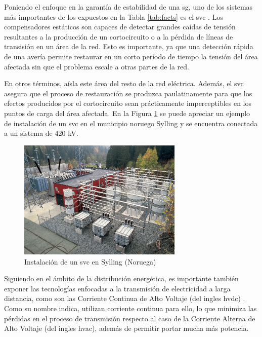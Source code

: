 Poniendo el enfoque en la garantía de estabilidad de una \gls{sg}, uno de los sistemas más importantes de los expuestos en la Tabla \ref{tab:facts} es el \gls{svc} \cite{facts}. Los compensadores estáticos son capaces de detectar grandes caídas de tensión resultantes a la producción de un cortocircuito o a la pérdida de líneas de transisión en un área de la red. Esto es importante, ya que una detección rápida de una avería permite restaurar en un corto período de tiempo la tensión del área afectada sin que el problema escale a otras partes de la red. 

\vspace{3mm}

En otros términos, aísla este área del resto de la red eléctrica. Además, el \gls{svc} asegura que el proceso de restauración se produzca paulatinamente para que los efectos producidos por el cortocircuito sean prácticamente imperceptibles en los puntos de carga del área afectada. En la Figura \ref{fig:svc} se puede apreciar un ejemplo de instalación de un \gls{svc} en el municipio noruego Sylling y se encuentra conectada a un sistema de 420 kV.

\begin{figure}[h!]
  \centering
  \includegraphics[width=0.7\textwidth]{img/teoria/svc.png}
  \caption{Instalación de un \acrshort{svc} en Sylling (Noruega) \cite{facts}}
  \label{fig:svc}
\end{figure}

Siguiendo en el ámbito de la distribución energética, es importante también exponer las tecnologías enfocadas a la transmisión de electricidad a larga distancia, como son las Corriente Continua de Alto Voltaje (del ingles \gls{hvdc}) \cite{hvdc}. Como su nombre indica, utilizan corriente continua para ello, lo que minimiza las pérdidas en el proceso de transmisión respecto al caso de la Corriente Alterna de Alto Voltaje (del ingles \gls{hvac}), además de permitir portar mucha más potencia. 

